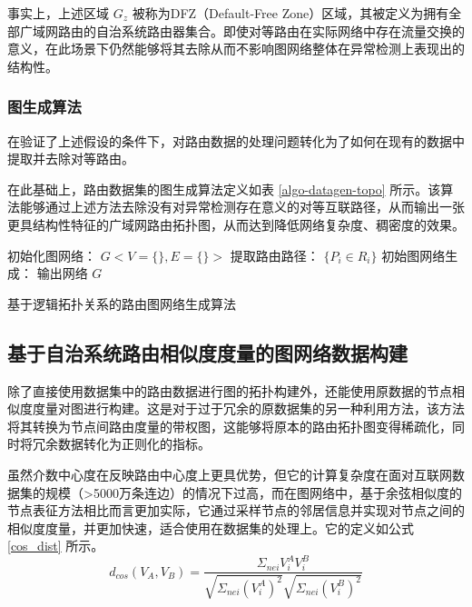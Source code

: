 事实上，上述区域 $G_z$ 被称为DFZ（Default-Free Zone）区域，其被定义为拥有全部广域网路由的自治系统路由器集合。即使对等路由在实际网络中存在流量交换的意义，在此场景下仍然能够将其去除从而不影响图网络整体在异常检测上表现出的结构性。

\subsubsection{图生成算法}

在验证了上述假设的条件下，对路由数据的处理问题转化为了如何在现有的数据中提取并去除对等路由。

在此基础上，路由数据集的图生成算法定义如表 \ref{algo-datagen-topo} 所示。该算法能够通过上述方法去除没有对异常检测存在意义的对等互联路径，从而输出一张更具结构性特征的广域网路由拓扑图，从而达到降低网络复杂度、稠密度的效果。

\begin{algorithm}[H]
    初始化图网络：
    $G<V=\{\},E=\{\}>$\;
    提取路由路径：
    $\{P_i \in R_i\}$\;
    初始图网络生成：
    输出网络 $G$\;
    \caption{基于逻辑拓扑关系的路由图网络生成算法}
    \label{algo-datagen-topo}
\end{algorithm}

\subsection{基于自治系统路由相似度度量的图网络数据构建}

除了直接使用数据集中的路由数据进行图的拓扑构建外，还能使用原数据的节点相似度度量对图进行构建。这是对于过于冗余的原数据集的另一种利用方法，该方法将其转换为节点间路由度量的带权图，这能够将原本的路由拓扑图变得稀疏化，同时将冗余数据转化为正则化的指标。

虽然介数中心度在反映路由中心度上更具优势，但它的计算复杂度在面对互联网数据集的规模（>5000万条连边）的情况下过高，而在图网络中，基于余弦相似度的节点表征方法相比而言更加实际，它通过采样节点的邻居信息并实现对节点之间的相似度度量，并更加快速，适合使用在数据集的处理上。它的定义如公式 \ref{cos_dist} 所示。
\begin{equation} \label{cos_dist}
d_{cos}(V_A,V_B) = \frac{\Sigma_{nei} V_i^A V_i^B}{\sqrt{\Sigma_{nei} (V_i^A)^2} \sqrt{\Sigma_{nei} (V_i^B)^2}}
\end{equation}

